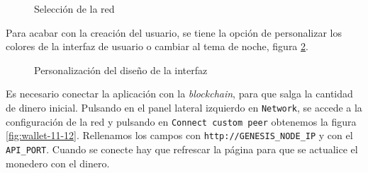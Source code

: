 \begin{figure}[H]
	\centering
	\caption{Selección de la red}
	\label{fig:wallet-6}
\end{figure}

Para acabar con la creación del usuario, se tiene la opción de personalizar los colores de la interfaz de usuario o cambiar al tema de noche, figura \ref{fig:wallet-7}.\\

\begin{figure}[H]
	\centering
	\caption{Personalización del diseño de la interfaz}
	\label{fig:wallet-7}
\end{figure}

\newpage
Es necesario conectar la aplicación con la \textit{blockchain}, para que salga la cantidad de dinero inicial. Pulsando en el panel lateral izquierdo en \texttt{Network}, se accede a la configuración de la red y pulsando en \texttt{Connect custom peer} obtenemos la figura \ref{fig:wallet-11-12}. Rellenamos los campos con \texttt{http://GENESIS\_NODE\_IP} y con el \texttt{API\_PORT}. Cuando se conecte hay que refrescar la página para que se actualice el monedero con el dinero.

